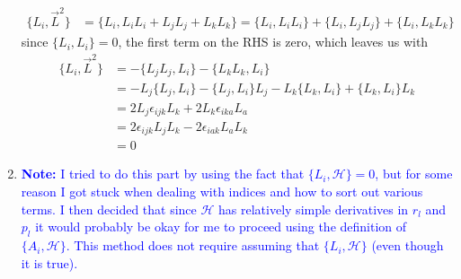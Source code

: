 \documentclass{article}
\theoremstyle{definition}
\newcommand{\ham}{\mathcal{H}}
\begin{document}
\begin{enumerate}[label=(\alph*)]
	\begin{align*}
	\{ L_i , \vec{L}^2 \} 
	&= \{ L_i , L_i L_i + L_jL_j + L_kL_k \} = \{L_i, L_iL_i\} +  \{L_i, L_jL_j \} + \{ L_i, L_kL_k \}
	\end{align*}
	since $\{L_i,L_i\} = 0$, the first term on the RHS is zero, which leaves us with
	\begin{align*}
	\boxed{\{ L_i , \vec{L}^2 \}} &= -\{L_jL_j, L_i\} - \{ L_kL_k, L_i \} \\
	&= -L_j\{ L_j,L_i \} - \{L_j,L_i\}L_j - L_k\{ L_k,L_i \} + \{L_k,L_i\}L_k \\
	&= 2L_j\epsilon_{ijk}L_k + 2L_k \epsilon_{ika}L_a\\
	&= 2\epsilon_{ijk}L_jL_k - 2\epsilon_{iak}L_aL_k\\
	&=\boxed{0}
	\end{align*}
	
	\item \textcolor{blue}{\textbf{Note:} I tried to do this part by using the fact that $\{L_i ,\ham\} = 0$, but for some reason I got stuck when dealing with indices and how to sort out various terms. I then decided that since $\ham$ has relatively simple derivatives in $r_l$ and $p_l$ it would probably be okay for me to proceed using the definition of $\{ A_i , \ham\}$. This method does not require assuming that $\{ L_i, \ham\}$ (even though it is true). }
	

\end{enumerate}
\end{document}
